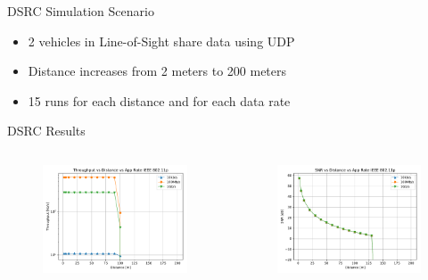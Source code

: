 \documentclass{beamer}
\begin{document}
	\begin{frame}{DSRC Simulation Scenario}
		\begin{itemize}
			\item 2 vehicles in Line-of-Sight share data using UDP\vspace{.5em}
			\item Distance increases from 2 meters to 200 meters\vspace{.5em}
			\item 15 runs for each distance and for each data rate
		\end{itemize}
	\end{frame}

	\begin{frame}{DSRC Results}
		\begin{columns}
				\begin{figure}
					\vspace{-0.1in}
					\includegraphics[scale=0.28]{throughput_distance_wave_UDP}
				\end{figure}
				\begin{figure}
					\vspace{-0.2in}
					\includegraphics[scale=0.28]{SNR_distance_wave_UDP}

\end{figure}
\end{columns}
\end{frame}
\end{document}
